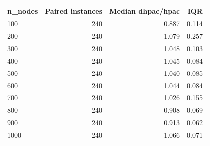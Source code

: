 \begin{tabular}{lrrr}
\toprule
n\_nodes & Paired instances & Median dhpac/hpac & IQR \\
\midrule
100 & 240 & 0.887 & 0.114 \\
200 & 240 & 1.079 & 0.257 \\
300 & 240 & 1.048 & 0.103 \\
400 & 240 & 1.045 & 0.084 \\
500 & 240 & 1.040 & 0.085 \\
600 & 240 & 1.044 & 0.084 \\
700 & 240 & 1.026 & 0.155 \\
800 & 240 & 0.908 & 0.069 \\
900 & 240 & 0.913 & 0.062 \\
1000 & 240 & 1.066 & 0.071 \\
\bottomrule
\end{tabular}

